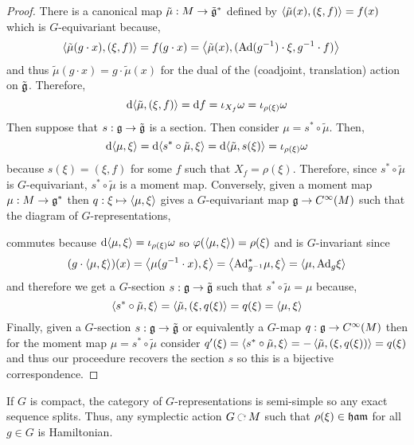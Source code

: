 \documentclass[12pt]{extarticle}
\newcommand{\Ad}{\mathrm{Ad}}
\begin{document}
\begin{proof}
There is a canonical map $\tilde{\mu} : M \to \tilde{\mathfrak{g}}^*$ defined by $\left< \tilde{\mu}(x) , (\xi, f) \right> = f(x)$ which is $G$-equivariant because,
\begin{align*}
\inner{\tilde{\mu}(g \cdot x)}{(\xi, f)} & = f(g \cdot x) = \inner{\tilde{\mu}(x)}{(\Ad(g^{-1}) \cdot \xi, g^{-1} \cdot f)} 
\end{align*}
and thus $\tilde{\mu}(g \cdot x) = g \cdot \tilde{\mu}(x)$ for the dual of the (coadjoint, translation) action on $\tilde{\mathfrak{g}}$. Therefore,
\[ \mathrm{d}{\left< \tilde{\mu} , (\xi, f) \right>} = \mathrm{d}{f} = \iota_{X_f} \omega = \iota_{\rho(\xi)} \omega \]
Then suppose that $s : \mathfrak{g} \to \tilde{\mathfrak{g}}$ is a section. Then consider $\mu = s^* \circ \tilde{\mu}$. Then,
\[ \mathrm{d}{\left< \mu , \xi \right>} = \mathrm{d}{\left< s^* \circ \tilde{\mu} , \xi \right>} = \mathrm{d}{\left< \tilde{\mu} , s(\xi) \right>} = \iota_{\rho(\xi)} \omega \]
because $s(\xi) = (\xi, f)$ for some $f$ such that $X_f = \rho(\xi)$. Therefore, since $s^* \circ \tilde{\mu}$ is $G$-equivariant, $s^* \circ \tilde{\mu}$ is a moment map. Conversely, given a moment map $\mu : M \to \mathfrak{g}^*$ then $q : \xi \mapsto \left< \mu , \xi \right>$ gives a $G$-equivariant map $\mathfrak{g} \to C^{\infty}(M)$ such that the diagram of $G$-representations,
\begin{center}
\end{center}
commutes because $\mathrm{d}{\left< \mu , \xi \right>} = \iota_{\rho(\xi)} \omega$ so $\varphi(\left< \mu , \xi \right>) = \rho(\xi)$ and is $G$-invariant since 
\[ (g \cdot \inner{\mu}{\xi})(x) = \inner{\mu(g^{-1} \cdot x)}{\xi} = \inner{\Ad_{g^{-1}}^* \mu}{\xi} = \inner{\mu}{\Ad_g \xi} \]
and therefore we get a $G$-section $s : \mathfrak{g} \to \tilde{\mathfrak{g}}$ such that $s^* \circ \tilde{\mu} = \mu$ because,
\[ \left< s^* \circ \tilde{\mu} , \xi \right> = \left< \tilde{\mu} , (\xi, q(\xi) \right> = q(\xi) = \left< \mu , \xi \right> \]
Finally, given a $G$-section $s : \mathfrak{g} \to \tilde{\mathfrak{g}}$ or equivalently a $G$-map $q : \mathfrak{g} \to C^{\infty}(M)$ then for the moment map $\mu = s^* \circ \tilde{\mu}$ consider $q'(\xi) = \left< s^* \circ \tilde{\mu} , \xi \right> = - \left< \tilde{\mu} , (\xi, q(\xi)) \right> = q(\xi)$ and thus our proceedure recovers the section $s$ so this is a bijective correspondence.
\end{proof}


\begin{rmk}
If $G$ is compact, the category of $G$-representations is semi-simple so any exact sequence splits. Thus, any symplectic action $G \acts M$ such that $\rho(\xi) \in \mathfrak{ham}$ for all $g \in G$ is Hamiltonian.
\end{rmk}
\end{document}
